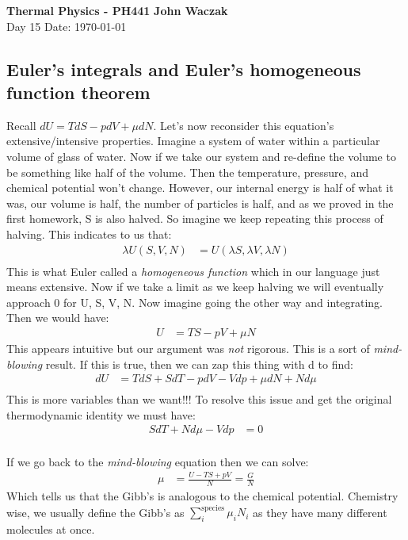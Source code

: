 \documentclass[a4paper, 11pt]{article}
\begin{document}
\noindent
\large\textbf{Thermal Physics - PH441} \hfill \textbf{John Waczak} \\
\normalsize Day 15 \hfill  Date: \today \\

	
\subsection*{Euler's integrals and Euler's homogeneous function theorem} 
	Recall $dU = TdS-pdV+\mu dN$. Let's now reconsider this equation's extensive/intensive properties. Imagine a system of water within a particular volume of glass of water. Now if we take our system and re-define the volume to be something like half of the volume. Then the temperature, pressure, and chemical potential won't change. However, our internal energy is half of what it was, our volume is half, the number of particles is half, and as we proved in the first homework, S is also halved. So imagine we keep repeating this process of halving. This indicates to us that: 
		\begin{align*}
			\lambda U(S,V,N) &= U(\lambda S, \lambda V, \lambda N) \\ 
		\end{align*}
	\noindent This is what Euler called a \textit{homogeneous function} which in our language just means extensive. Now if we take a limit as we keep halving we will eventually approach 0 for U, S, V, N. Now imagine going the other way and integrating. Then we would have: 
		\begin{align*}
			U &= TS - pV + \mu N
		\end{align*}
	This appears intuitive but our argument was \textit{not} rigorous. This is a sort of \textit{mind-blowing} result. If this is true, then we can zap this thing with d to find: 
		\begin{align*}
			dU &= TdS+SdT-pdV-Vdp+\mu dN + Nd\mu \\ 
		\end{align*}
	This is more variables than we want!!! To resolve this issue and get the original thermodynamic identity we must have: 
		\begin{align*}
			SdT + Nd\mu -Vdp &= 0 \\ 
		\end{align*}
	
	If we go back to the \textit{mind-blowing} equation then we can solve: 
		\begin{align*}
			\mu &= \frac{U-TS+pV}{N} = \frac{G}{N}
		\end{align*}
	Which tells us that the Gibb's is analogous to the chemical potential. Chemistry wise, we usually define the Gibb's as $\sum\limits_i^{\text{species}}\mu_iN_i$ as they have many different molecules at once. \\ 
	
\end{document}
